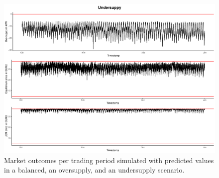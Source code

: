 \begin{figure}[H]
    \centering
    \includegraphics[width=\textwidth-.85cm]{thesis/graphs/marketsimulation/marketoutcome_pred_undersupply.pdf}
    \caption[Market outcomes simulated with predicted values in three supply scenarios]{Market outcomes per trading period simulated with predicted values in a balanced, an oversupply, and an undersupply scenario. \quantnet\href{}{}}
\end{figure}

